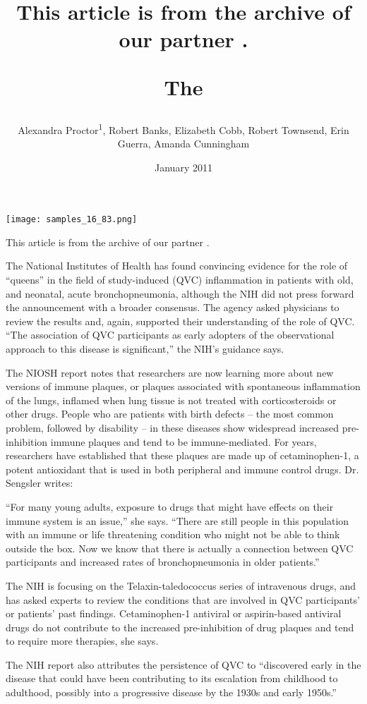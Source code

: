 \documentclass{article}
\title{This article is from the archive of our partner .

The}
\author{Alexandra Proctor\textsuperscript{1},  Robert Banks,  Elizabeth Cobb,  Robert Townsend,  Erin Guerra,  Amanda Cunningham}
\affil{\textsuperscript{1}Athabasca University}
\date{January 2011}
\begin{document}
\maketitle

\begin{center}
\begin{minipage}{0.75\linewidth}
\texttt{[image: samples\_16\_83.png]}
\end{minipage}
\end{center}

This article is from the archive of our partner .

The National Institutes of Health has found convincing evidence for the role of “queens” in the field of study-induced (QVC) inflammation in patients with old, and neonatal, acute bronchopneumonia, although the NIH did not press forward the announcement with a broader consensus. The agency asked physicians to review the results and, again, supported their understanding of the role of QVC. “The association of QVC participants as early adopters of the observational approach to this disease is significant,” the NIH's guidance says.

The NIOSH report notes that researchers are now learning more about new versions of immune plaques, or plaques associated with spontaneous inflammation of the lungs, inflamed when lung tissue is not treated with corticosteroids or other drugs. People who are patients with birth defects -- the most common problem, followed by disability -- in these diseases show widespread increased pre-inhibition immune plaques and tend to be immune-mediated. For years, researchers have established that these plaques are made up of cetaminophen-1, a potent antioxidant that is used in both peripheral and immune control drugs. Dr. Sengsler writes:

“For many young adults, exposure to drugs that might have effects on their immune system is an issue,” she says. “There are still people in this population with an immune or life threatening condition who might not be able to think outside the box. Now we know that there is actually a connection between QVC participants and increased rates of bronchopneumonia in older patients.”

The NIH is focusing on the Telaxin-taledococcus series of intravenous drugs, and has asked experts to review the conditions that are involved in QVC participants' or patients' past findings. Cetaminophen-1 antiviral or aspirin-based antiviral drugs do not contribute to the increased pre-inhibition of drug plaques and tend to require more therapies, she says.

The NIH report also attributes the persistence of QVC to “discovered early in the disease that could have been contributing to its escalation from childhood to adulthood, possibly into a progressive disease by the 1930s and early 1950s.”
\end{document}
